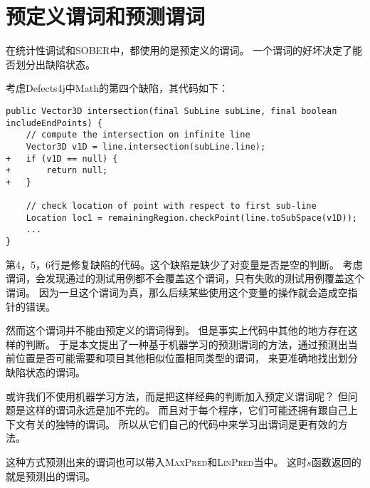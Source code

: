 
\section{预定义谓词和预测谓词}

在统计性调试和SOBER中，都使用的是预定义的谓词。
一个谓词的好坏决定了能否划分出缺陷状态。

考虑Defects4j中Math的第四个缺陷，其代码如下：
\lstset{language=Java}
\begin{lstlisting}
public Vector3D intersection(final SubLine subLine, final boolean includeEndPoints) {
    // compute the intersection on infinite line 
    Vector3D v1D = line.intersection(subLine.line);
+   if (v1D == null) {
+       return null;
+   } 

    // check location of point with respect to first sub-line
    Location loc1 = remainingRegion.checkPoint(line.toSubSpace(v1D));
    ... 
}
\end{lstlisting}

第4，5，6行是修复缺陷的代码。这个缺陷是缺少了对变量是否是空的判断。
考虑谓词，会发现通过的测试用例都不会覆盖这个谓词，只有失败的测试用例覆盖这个谓词。
因为一旦这个谓词为真，那么后续某些使用这个变量的操作就会造成空指针的错误。

然而这个谓词并不能由预定义的谓词得到。
但是事实上代码中其他的地方存在这样的判断。
于是本文提出了一种基于机器学习的预测谓词的方法，通过预测出当前位置是否可能需要和项目其他相似位置相同类型的谓词，
来更准确地找出划分缺陷状态的谓词。

或许我们不使用机器学习方法，而是把这样经典的判断加入预定义谓词呢？
但问题是这样的谓词永远是加不完的。
而且对于每个程序，它们可能还拥有跟自己上下文有关的独特的谓词。
所以从它们自己的代码中来学习出谓词是更有效的方法。

这种方式预测出来的谓词也可以带入\textsc{MaxPred}和\textsc{LinPred}当中。
这时$s$函数返回的就是预测出的谓词。

